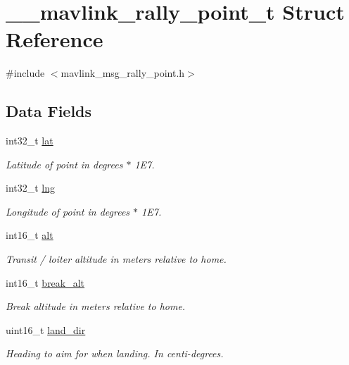 \hypertarget{struct____mavlink__rally__point__t}{\section{\+\_\+\+\_\+mavlink\+\_\+rally\+\_\+point\+\_\+t Struct Reference}
\label{struct____mavlink__rally__point__t}
}


{\ttfamily \#include $<$mavlink\+\_\+msg\+\_\+rally\+\_\+point.\+h$>$}

\subsection*{Data Fields}
\begin{DoxyCompactItemize}
\item 
int32\+\_\+t \hyperlink{struct____mavlink__rally__point__t_a42803d18a5c9abf2e3cfca5ca68c3c47}{lat}
\begin{DoxyCompactList}\small\item\em Latitude of point in degrees $\ast$ 1\+E7. \end{DoxyCompactList}\item 
int32\+\_\+t \hyperlink{struct____mavlink__rally__point__t_a54029ae69f5e7fb5d1efe1ed19efcdb4}{lng}
\begin{DoxyCompactList}\small\item\em Longitude of point in degrees $\ast$ 1\+E7. \end{DoxyCompactList}\item 
int16\+\_\+t \hyperlink{struct____mavlink__rally__point__t_a674a401df2e48e64375f20555b631632}{alt}
\begin{DoxyCompactList}\small\item\em Transit / loiter altitude in meters relative to home. \end{DoxyCompactList}\item 
int16\+\_\+t \hyperlink{struct____mavlink__rally__point__t_ae9ba7f47b482b454886afec9c2c3edfa}{break\+\_\+alt}
\begin{DoxyCompactList}\small\item\em Break altitude in meters relative to home. \end{DoxyCompactList}\item 
uint16\+\_\+t \hyperlink{struct____mavlink__rally__point__t_a0465147fc43ee3a89e5959b36b2e2f8b}{land\+\_\+dir}
\begin{DoxyCompactList}\small\item\em Heading to aim for when landing. In centi-\/degrees. \end{DoxyCompactList}\item 

\end{DoxyCompactItemize}
